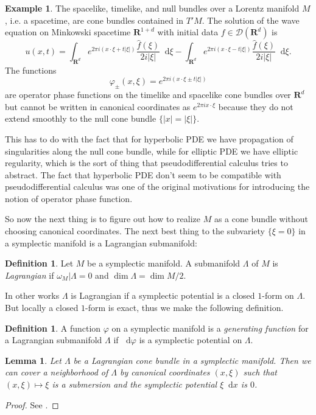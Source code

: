 \documentclass[reqno,12pt,letterpaper]{amsart}
\newcommand{\RR}{\mathbf{R}}
\newcommand{\Distr}{\mathscr D}
\newcommand*\dif{\mathop{}\!\mathrm{d}}
\newcommand{\dfn}[1]{\emph{#1}\index{#1}}
\newtheorem{lemma}[theorem]{Lemma}
\theoremstyle{definition}
\newtheorem{definition}[theorem]{Definition}
\newtheorem{example}[theorem]{Example}
\numberwithin{equation}{section}
\begin{document}
\begin{example}
The spacelike, timelike, and null bundles over a Lorentz manifold $M$, i.e. a spacetime, are cone bundles contained in $T'M$.
The solution of the wave equation on Minkowski spacetime $\RR^{1 + d}$ with initial data $f \in \Distr(\RR^d)$ is 
$$u(x, t) = \int_{\RR^d} e^{2\pi i(x\cdot \xi + t|\xi|)} \frac{\hat f(\xi)}{2i|\xi|} \dif \xi - \int_{\RR^d} e^{2\pi i(x\cdot \xi - t|\xi|)} \frac{\hat f(\xi)}{2i|\xi|} \dif \xi.$$
The functions 
$$\varphi_\pm(x, \xi) = e^{2\pi i(x \cdot \xi \pm t|\xi|)}$$
are operator phase functions on the timelike and spacelike cone bundles over $\RR^d$ but cannot be written in canonical coordinates as $e^{2\pi ix\cdot \xi}$ because they do not extend smoothly to the null cone bundle $\{|x| = |\xi|\}$.

This has to do with the fact that for hyperbolic PDE we have propagation of singularities along the null cone bundle, while for elliptic PDE we have elliptic regularity, which is the sort of thing that pseudodifferential calculus tries to abstract.
The fact that hyperbolic PDE don't seem to be compatible with pseudodifferential calculus was one of the original motivations for introducing the notion of operator phase function.
\end{example}

So now the next thing is to figure out how to realize $M$ as a cone bundle without choosing canonical coordinates.
The next best thing to the subvariety $\{\xi = 0\}$ in a symplectic manifold is a Lagrangian submanifold:

\begin{definition}
Let $M$ be a symplectic manifold. A submanifold $\Lambda$ of $M$ is \dfn{Lagrangian} if $\omega_M|\Lambda = 0$ and $\dim \Lambda = \dim M/2$.
\end{definition}

In other works $\Lambda$ is Lagrangian if a symplectic potential is a closed $1$-form on $\Lambda$.
But locally a closed $1$-form is exact, thus we make the following definition.

\begin{definition}
A function $\varphi$ on a symplectic manifold is a \dfn{generating function} for a Lagrangian submanifold $\Lambda$ if $\dif \varphi$ is a symplectic potential on $\Lambda$.
\end{definition}

\begin{lemma}
Let $\Lambda$ be a Lagrangian cone bundle in a symplectic manifold.
Then we can cover a neighborhood of $\Lambda$ by canonical coordinates $(x, \xi)$ such that $(x, \xi) \mapsto \xi$ is a submersion and the symplectic potential $\xi \dif x$ is $0$.
\end{lemma}
\begin{proof}
See \cite[pg136]{HoFIOS1}.
\end{proof}
\end{document}
